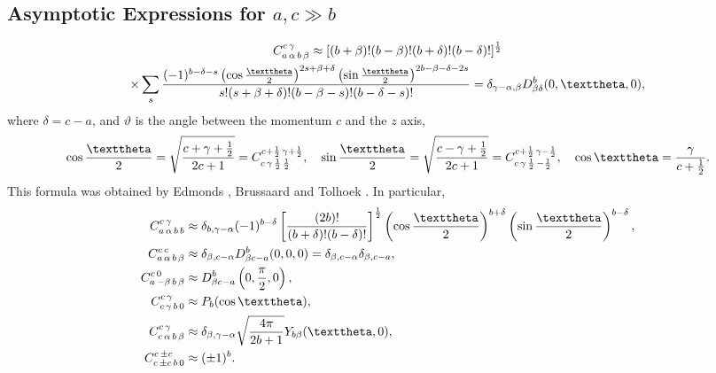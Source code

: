 \subsection{Asymptotic Expressions for $a, c \gg b$}\label{sec:8.9.1}
\begin{multline}
\clebsch{a}{\alpha}{b}{\beta}{c}{\gamma} \approx[(b+\beta)!(b-\beta)!(b+\delta)!(b-\delta)!]^{\frac{1}{2}}  \\
\times \sum_{s} \frac{(-1)^{b-\delta-s}\left(\cos \frac{\vartheta}{2}\right)^{2s+\beta+\delta}\left(\sin \frac{\vartheta}{2}\right)^{2 b-\beta-\delta-2 s}}{s!(s+\beta+\delta)!(b-\beta-s)!(b-\delta-s)!}=\delta_{\gamma-\alpha, \beta} D_{\beta \delta}^{b}(0, \vartheta, 0), \label{eq:8:9:1}
\end{multline}
where $\delta=c-a$, and $\vartheta$ is the angle between the momentum $c$ and the $z$ axis,
\begin{equation}
\cos \frac{\vartheta}{2}=\sqrt{\frac{c+\gamma+\frac{1}{2}}{2 c+1}}=\clebsch{c}{\gamma}{\frac{1}{2}}{\frac{1}{2}}{c+\frac{1}{2}}{\gamma+\frac{1}{2}}, \quad \sin \frac{\vartheta}{2}=\sqrt{\frac{c-\gamma+\frac{1}{2}}{2 c+1}}=\clebsch{c}{\gamma}{\frac{1}{2}}{-\frac{1}{2}}{c+\frac{1}{2}}{\gamma-\frac{1}{2}}, \quad \cos \vartheta=\frac{\gamma}{c+\frac{1}{2}} . \label{eq:8:9:2}
\end{equation}
This formula was obtained by Edmonds \cite{ref064}, Brussaard and Tolhoek \cite{ref060}. In particular,
\begin{align}
\clebsch{a}{\alpha}{b}{b}{c}{\gamma} &\approx \delta_{b, \gamma-\alpha}(-1)^{b-\delta}\left[\frac{(2 b)!}{(b+\delta) !(b-\delta)!}\right]^{\frac{1}{2}}\left(\cos \frac{\vartheta}{2}\right)^{b+\delta}\left(\sin \frac{\vartheta}{2}\right)^{b-\delta}, \label{eq:8:9:3}\\
\clebsch{a}{\alpha}{b}{\beta}{c}{c} &\approx \delta_{\beta, c-\alpha} D_{\beta c-a}^{b}(0,0,0)=\delta_{\beta, c-\alpha} \delta_{\beta, c-a}, \label{eq:8:9:4}\\
\clebsch{a}{-\beta}{b}{\beta}{c}{0} &\approx D_{\beta c-a}^{b}\left(0, \frac{\pi}{2}, 0\right), \label{eq:8:9:5}\\
\clebsch{c}{\gamma}{b}{0}{c}{\gamma} &\approx P_{b}(\cos \vartheta), \label{eq:8:9:6}\\
\clebsch{c}{\alpha}{b}{\beta}{c}{\gamma} &\approx \delta_{\beta, \gamma-\alpha} \sqrt{\frac{4 \pi}{2 b+1}} Y_{b \beta}(\vartheta, 0), \label{eq:8:9:7}\\
\clebsch{c}{\pm c}{b}{0}{c}{\pm c} &\approx( \pm 1)^{b}. \label{eq:8:9:8}
\end{align}
